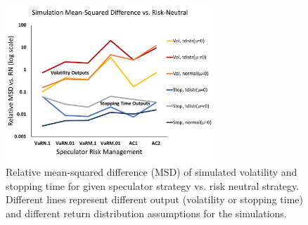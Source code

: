 \begin{figure}
	\centering
	\includegraphics[width=0.7\textwidth]{figures/simulation_msd_figure_2}
	\caption{Relative mean-squared difference (MSD) of simulated volatility and stopping time for given speculator strategy vs. risk neutral strategy. Different lines represent different output (volatility or stopping time) and different return distribution assumptions for the simulations.}\label{fig:simulation_msd}
\end{figure}






